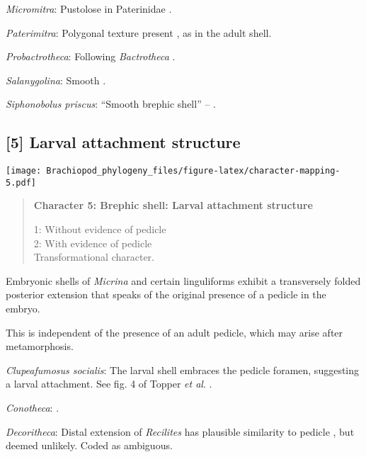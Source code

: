 \documentclass[openany]{book}
\theoremstyle{definition}
\theoremstyle{definition}
\theoremstyle{definition}
\theoremstyle{remark}
\begin{document}
\hypertarget{Micromitra-coding-4}{}
\emph{Micromitra}: Pustolose in Paterinidae \citep[table
6]{Williams2000LinguliformeaCraniiformea}.

\hypertarget{Paterimitra-coding-4}{}
\emph{Paterimitra}: Polygonal texture present
\citep{Holmer2011Firstrecord}, as in the adult shell.

\hypertarget{Probactrotheca-coding-4}{}
\emph{Probactrotheca}: Following \emph{Bactrotheca}
\citep{Dzik1980Ontogenyof}.

\hypertarget{Salanygolina-coding-4}{}
\emph{Salanygolina}: Smooth \citep{Holmer2009Theenigmatic}.

\hypertarget{Siphonobolus_priscus-coding-4}{}
\emph{Siphonobolus priscus}: ``Smooth brephic shell'' --
\citet{Popov2009Earlyontogeny}.

\subsection*{{[}5{]} Larval attachment
structure}\label{larval-attachment-structure}

\texttt{[image: Brachiopod\_phylogeny\_files/figure-latex/character-mapping-5.pdf]}

\begin{quote}
\textbf{Character 5: Brephic shell: Larval attachment structure}

1: Without evidence of pedicle\\
2: With evidence of pedicle\\
Transformational character.
\end{quote}

Embryonic shells of \emph{Micrina} and certain linguliforms exhibit a
transversely folded posterior extension that speaks of the original
presence of a pedicle in the embryo.

This is independent of the presence of an adult pedicle, which may arise
after metamorphosis.

\hypertarget{Clupeafumosus_socialis-coding-5}{}
\emph{Clupeafumosus socialis}: The larval shell embraces the pedicle
foramen, suggesting a larval attachment. See fig. 4 of Topper \emph{et
al}. \citeyearpar{Topper2013Reappraisalof}.

\hypertarget{Conotheca-coding-5}{}
\emph{Conotheca}: \citep{Wrona2003}.

\hypertarget{Decoritheca-coding-5}{}
\emph{Decoritheca}: Distal extension of \emph{Recilites} has plausible
similarity to pedicle \citep{Dzik1978}, but deemed unlikely. Coded as
ambiguous.
\end{document}
